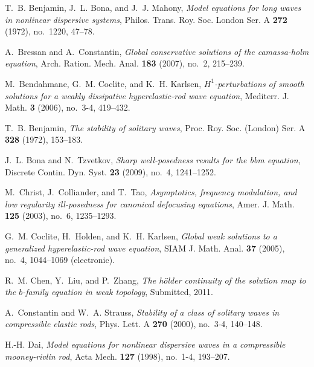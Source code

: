 \documentclass[12pt,oneside,reqno]{amsbook}
\numberwithin{equation}{section}
\begin{document}
\begin{thebibliography}{100}
    \setlength{\itemsep}{0.2in}
    \normalsize
\providecommand{\bysame}{\leavevmode\hbox to3em{\hrulefill}\thinspace}
    \singlespace
{}
T.~B. Benjamin, J.~L. Bona, and J.~J. Mahony, \emph{Model equations for long
  waves in nonlinear dispersive systems}, Philos. Trans. Roy. Soc. London Ser.
  A \textbf{272} (1972), no.~1220, 47--78.

A.~Bressan and A.~Constantin, \emph{Global conservative solutions of the
  camassa-holm equation}, Arch. Ration. Mech. Anal. \textbf{183} (2007), no.~2,
  215--239.

M.~Bendahmane, G.~M. Coclite, and K.~H. Karlsen,
  \emph{$H^1$-perturbations of smooth solutions for a weakly dissipative
  hyperelastic-rod wave equation}, Mediterr. J. Math. \textbf{3} (2006),
  no.~3-4, 419--432.

T.~B. Benjamin, \emph{The stability of solitary waves}, Proc. Roy. Soc.
  (London) Ser. A \textbf{328} (1972), 153--183.

J.~L. Bona and N.~Tzvetkov, \emph{Sharp well-posedness results for the bbm
  equation}, Discrete Contin. Dyn. Syst. \textbf{23} (2009), no.~4, 1241--1252.

M.~Christ, J.~Colliander, and T.~Tao, \emph{Asymptotics, frequency modulation,
  and low regularity ill-posedness for canonical defocusing equations}, Amer.
  J. Math. \textbf{125} (2003), no.~6, 1235--1293.

G.~M. Coclite, H.~Holden, and K.~H. Karlsen, \emph{Global weak solutions to a
  generalized hyperelastic-rod wave equation}, SIAM J. Math. Anal. \textbf{37}
  (2005), no.~4, 1044--1069 (electronic).

R.~M. Chen, Y.~Liu, and P.~Zhang, \emph{The h\"{o}lder continuity of the
  solution map to the $b$-family equation in weak topology}, Submitted, 2011.

A.~Constantin and W.~A. Strauss, \emph{Stability of a class of solitary waves
  in compressible elastic rods}, Phys. Lett. A \textbf{270} (2000), no.~3-4,
  140--148.

H.-H. Dai, \emph{Model equations for nonlinear dispersive waves in a
  compressible mooney-rivlin rod}, Acta Mech. \textbf{127} (1998), no.~1-4,
  193--207.


\end{thebibliography}
\end{document}
